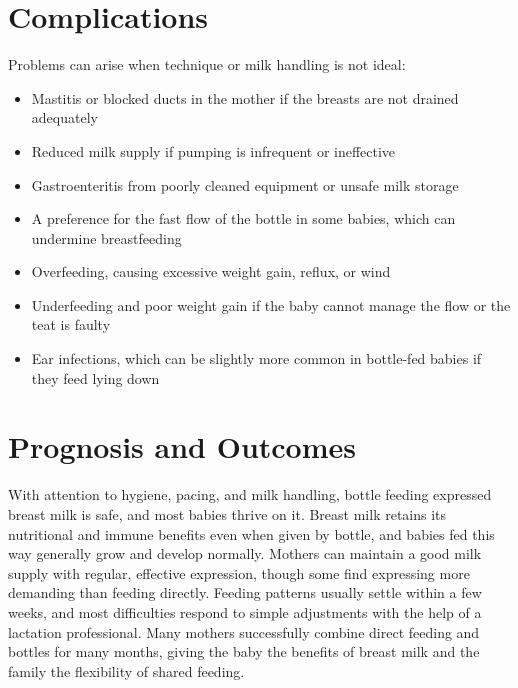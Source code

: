 \section*{Complications}
Problems can arise when technique or milk handling is not ideal:
\begin{itemize}
    \item Mastitis or blocked ducts in the mother if the breasts are not drained adequately
    \item Reduced milk supply if pumping is infrequent or ineffective
    \item Gastroenteritis from poorly cleaned equipment or unsafe milk storage
    \item A preference for the fast flow of the bottle in some babies, which can undermine breastfeeding
    \item Overfeeding, causing excessive weight gain, reflux, or wind
    \item Underfeeding and poor weight gain if the baby cannot manage the flow or the teat is faulty
    \item Ear infections, which can be slightly more common in bottle-fed babies if they feed lying down
\end{itemize}

\section*{Prognosis and Outcomes}
With attention to hygiene, pacing, and milk handling, bottle feeding expressed breast milk is safe, and most babies thrive on it. Breast milk retains its nutritional and immune benefits even when given by bottle, and babies fed this way generally grow and develop normally. Mothers can maintain a good milk supply with regular, effective expression, though some find expressing more demanding than feeding directly. Feeding patterns usually settle within a few weeks, and most difficulties respond to simple adjustments with the help of a lactation professional. Many mothers successfully combine direct feeding and bottles for many months, giving the baby the benefits of breast milk and the family the flexibility of shared feeding.

